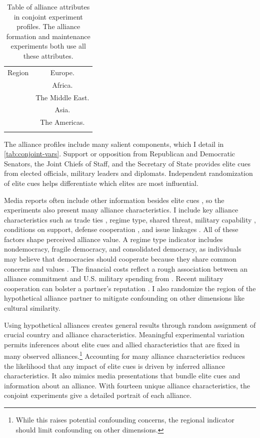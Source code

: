 \documentclass[12pt]{article}
\begin{document}
\begin{table}
\begin{adjustbox}{width = .99\textwidth}
\begin{tabular}{lc}
Region              & Europe. \\ 
                    & Africa. \\
                    & The Middle East. \\ 
                    & Asia. \\   
                    & The Americas. \\ 
                                                                            
\hline \\
\end{tabular}
\end{adjustbox}
\caption{Table of alliance attributes in conjoint experiment profiles. The alliance formation and maintenance experiments both use all these attributes.} 
\label{tab:conjoint-vars}
\end{table}


The alliance profiles include many salient components, which I detail in \autoref{tab:conjoint-vars}. 
Support or opposition from Republican and Democratic Senators, the Joint Chiefs of Staff, and the Secretary of State provides elite cues from elected officials, military leaders and diplomats. 
Independent randomization of elite cues helps differentiate which elites are most influential.


Media reports often include other information besides elite cues \citep{BaumPotter2008}, so the experiments also present many alliance characteristics. 
I include key alliance characteristics such as trade ties \citep{Fordham2010}, regime type, shared threat, military capability \citep{Johnsonetal2015}, conditions on support, defense cooperation \citep{Morrow1994, LeedsAnac2005}, and issue linkages \citep{Poast2012}.
All of these factors shape perceived alliance value. 
A regime type indicator includes nondemocracy, fragile democracy, and consolidated democracy, as individuals may believe that democracies should cooperate because they share common concerns and values \citep{Chuetal2021}. 
The financial costs reflect a rough association between an alliance commitment and U.S. military spending from \citet{AlleyFuhrmann2021}. 
Recent military cooperation can bolster a partner's reputation \citep{Crescenzietal2012, GannonKent2020}.
I also randomize the region of the hypothetical alliance partner to mitigate confounding on other dimensions like cultural similarity.


Using hypothetical alliances creates general results through random assignment of crucial country and alliance characteristics. 
Meaningful experimental variation permits inferences about elite cues and allied characteristics that are fixed in many observed alliances.\footnote{While this raises potential confounding concerns, the regional indicator should limit confounding on other dimensions.}
Accounting for many alliance characteristics reduces the likelihood that any impact of elite cues is driven by inferred alliance characteristics.
It also mimics media presentations that bundle elite cues and information about an alliance. 
With fourteen unique alliance characteristics, the conjoint experiments give a detailed portrait of each alliance.
\end{document}
